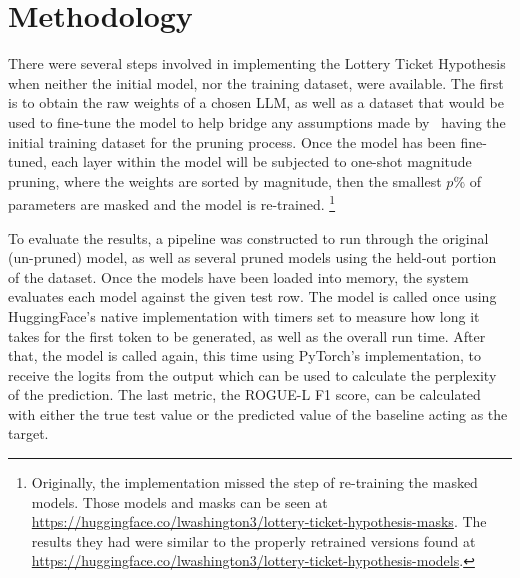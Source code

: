 \documentclass[
	title={Lottery Ticket Hypothesis for Large Language Models}
]{cs595project}
\newcommand{\ROGUE}{ROGUE}
\newcommand{\ROUGE}{ROGUE}
\begin{document}
\section{Methodology}\label{sec:methodology}
There were several steps involved in implementing the Lottery Ticket Hypothesis when neither the initial model, nor the training dataset, were available.
The first is to obtain the raw weights of a chosen LLM, as well as a dataset that would be used to fine-tune the model to help bridge any assumptions made by~\cite{Lottery-Ticket-Hypothesis} having the initial training dataset for the pruning process.
Once the model has been fine-tuned, each layer within the model will be subjected to one-shot magnitude pruning, where the weights are sorted by magnitude, then the smallest $p\%$ of parameters are masked and the model is re-trained.%
\footnote{Originally, the implementation missed the step of re-training the masked models.
Those models and masks can be seen at \url{https://huggingface.co/lwashington3/lottery-ticket-hypothesis-masks}.
The results they had were similar to the properly retrained versions found at \url{https://huggingface.co/lwashington3/lottery-ticket-hypothesis-models}.}

To evaluate the results, a pipeline was constructed to run through the original (un-pruned) model, as well as several pruned models using the held-out portion of the dataset.
Once the models have been loaded into memory, the system evaluates each model against the given test row.
The model is called once using HuggingFace's native implementation with timers set to measure how long it takes for the first token to be generated, as well as the overall run time.
After that, the model is called again, this time using PyTorch's implementation, to receive the logits from the output which can be used to calculate the perplexity of the prediction.
The last metric, the \ROGUE-L F1 score, can be calculated with either the true test value or the predicted value of the baseline acting as the target.
\end{document}
